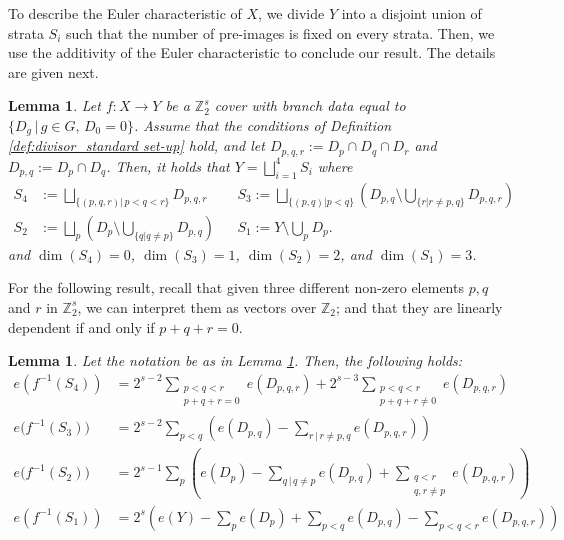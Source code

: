 \documentclass[12pt,twoside,]{amsart}
\theoremstyle{plain}
\newtheorem{lemma}[theorem]{Lemma}
\theoremstyle{definition}
\newcommand{\Z}{\mathbb Z}
\begin{document}
To describe the Euler characteristic of $X$, we divide $Y$ into a disjoint union of strata $S_i$ such that the number of pre-images is fixed on every strata. Then, we use the additivity of the Euler characteristic to conclude our result.  The details are given next.
\begin{lemma}\label{lemma:strata}
Let $f: X \to Y$ be a $\mathbb{Z}_2^s$ cover with branch data equal to $\{D_g \, |\, g \in G, \, D_0 = 0\}$. 
Assume that the conditions of Definition \ref{def:divisor_standard set-up} hold, and let 
\(D_{p,q,r}:=D_p \cap D_q \cap D_r \) and
\( D_{p,q}:= D_p \cap D_q  \). 
Then, it holds that
\(  Y = \bigsqcup_{i=1}^{4} S_i \)
where 
\begin{align*}
S_4 &:=\bigsqcup_{\{(p,q,r) | \, p < q < r\}}  
    D_{p,q,r}
    &&
S_3 :=
    \bigsqcup_{\{(p,q) | p < q\}} 
    \left( 
   D_{p,q} \setminus
   \bigcup_{\{r | r \neq p, q\}}D_{p,q,r}
    \right)    
\\
S_2 &:=  
    \bigsqcup_p 
    \left( 
    D_p \setminus
    \bigcup_{\{q | q \neq p\}}D_{p,q} 
    \right)
&&     
S_1 := Y \setminus \bigcup_p D_p.  
\end{align*}
and  $\dim(S_4) = 0$, $\dim(S_3) = 1$, $\dim(S_2) = 2$, and  $\dim(S_1) = 3$.  
\end{lemma}
For the following result, recall that given three different non-zero elements
 $p,q$ and $r$ in $\Z_2^s$, we 
can interpret them as vectors over $\Z_2$; and that they are linearly dependent if and only if
$p+q+r=0$.  
\begin{lemma}\label{lemma:e(strata)}
Let the notation be as in Lemma \ref{lemma:strata}.
Then, the following holds:
\begin{align*}
e(f^{-1}(S_4)) &=
2^{s-2} 
\sum_{\substack{p<q<r \\ p+q+r =0}}
e(D_{p,q,r})
+
2^{s-3} 
\sum_{\substack{p < q <r \\ p+q+r \neq 0} }
e(D_{p,q,r})
\\
e\big(f^{-1}(S_3)\big)
&=
2^{s-2}\sum_{p < q} \left(
e(D_{p,q}) - \sum_{r \, | \, r \neq p,q}
e(D_{p,q,r})
\right)  
\\
e\bigl(f^{-1}(S_2)\bigr)
&=
2^{s-1}  \sum_{p}\left(
e(D_p) - 
\sum_{ q \, | \, q \neq p} e(D_{p,q}) + 
\sum_{\substack{q<r\\ q,r\neq p}}
e(D_{p,q,r})
  \right)
  \\
e(f^{-1}(S_1))
&= 2^{s} \left( e(Y) - 
\sum_p e\left( D_p \right) + 
\sum_{p < q} e\left( D_{p,q} \right) -
\sum_{p < q < r} e\left( D_{p, q, r} \right)
\right)
\end{align*}  
\end{lemma}
\end{document}
